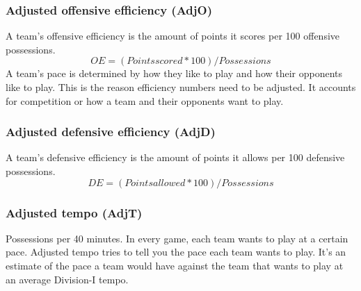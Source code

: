 \documentclass[
10pt, %
a4paper, %
oneside, %
headinclude,footinclude, %
BCOR5mm, %
]{scrartcl}
\begin{document}
\subsubsection{Adjusted offensive efficiency (AdjO)}
A team's offensive efficiency is the amount of points it scores per 100 offensive possessions.
\[OE = (Points scored * 100) / Possessions\]
A team's pace is determined by how they like to play and how their opponents like to play. This is the reason efficiency numbers need to be adjusted. It accounts for competition or how a team and their opponents want to play.

\subsubsection{Adjusted defensive efficiency (AdjD)}
A team's defensive efficiency is the amount of points it allows per 100 defensive possessions.
\[DE = (Points allowed * 100) / Possessions\]

\subsubsection{Adjusted tempo (AdjT)}
Possessions per 40 minutes. In every game, each team wants to play at a certain pace. Adjusted tempo tries to tell you the pace each team wants to play. It's an estimate of the pace a team would have against the team that wants to play at an average Division-I tempo.
\end{document}
